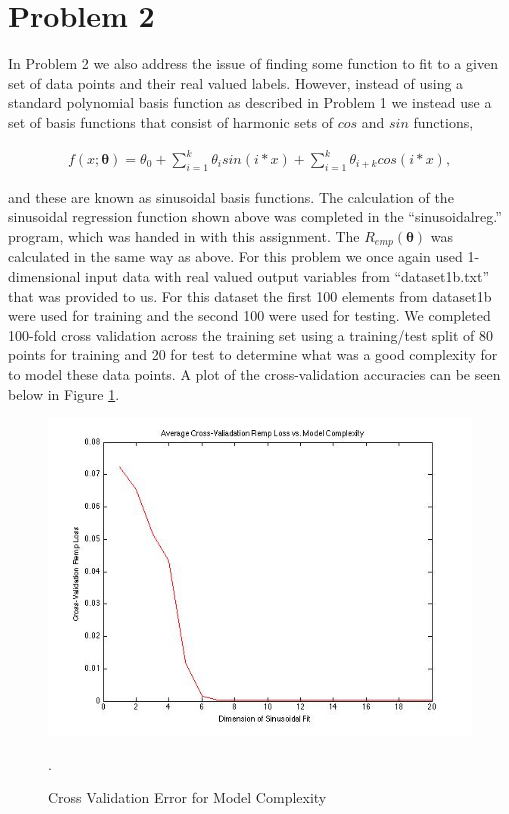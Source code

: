 \documentclass[paper=a4, fontsize=11pt]{scrartcl} %
\begin{document}
\section{Problem 2}

In Problem 2 we also address the issue of finding some function to fit to a given set of data points and their real valued labels.  However, instead of using a standard polynomial basis function as described in Problem 1 we instead use a set of basis functions that consist of harmonic sets of $cos$ and $sin$ functions, 

\begin{align}
f(x;\bm{\theta}) = \theta_{0} +\sum\limits_{i=1}^k \theta_{i}sin(i*x) + \sum\limits_{i=1}^k \theta_{i+k}cos(i*x),
\end{align}

and these are known as sinusoidal basis functions.
The calculation of the sinusoidal regression function shown above was completed in the  ``sinusoidalreg.'' program, which was handed in with this assignment.  
The $R_{emp}(\bm{\theta})$ was calculated in the same way as above.
For this problem we once again used 1-dimensional input data with real valued output variables from ``dataset1b.txt'' that was provided to us.
For this dataset the first 100 elements from dataset1b were used for training and the second 100 were used for testing.
We completed 100-fold cross validation across the training set using a training/test split of 80 points for training and 20 for test to determine what was a good complexity for to model these data points.
A plot of the cross-validation accuracies can be seen below in Figure \ref{fig:prob2_crossvalerrors}.

\begin{figure}
\centering
\includegraphics[scale=0.4]{Prob2_CrossValError.jpg}
\caption{Cross Validation Error for Model Complexity}
\label{fig:prob2_crossvalerrors}.
\end{figure}
\end{document}
